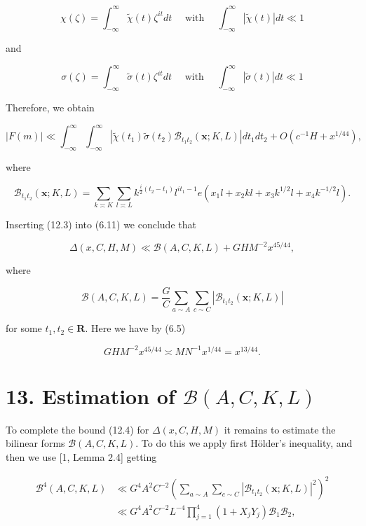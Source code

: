 \documentclass[10pt]{article}
\begin{document}
$$
\chi(\zeta)=\int_{-\infty}^{\infty} \tilde{\chi}(t) \zeta^{i t} d t \quad \text { with } \quad \int_{-\infty}^{\infty}|\tilde{\chi}(t)| d t \ll 1
$$

and

$$
\sigma(\zeta)=\int_{-\infty}^{\infty} \tilde{\sigma}(t) \zeta^{i t} d t \quad \text { with } \quad \int_{-\infty}^{\infty}|\tilde{\sigma}(t)| d t \ll 1
$$

Therefore, we obtain


\begin{equation*}
|F(m)| \ll \int_{-\infty}^{\infty} \int_{-\infty}^{\infty}\left|\tilde{\chi}\left(t_{1}\right) \tilde{\sigma}\left(t_{2}\right) \mathscr{B}_{t_{1} t_{2}}(\mathbf{x} ; K, L)\right| d t_{1} d t_{2}+O\left(c^{-1} H+x^{1 / 44}\right), \tag{12.3}
\end{equation*}


where

$$
\mathscr{B}_{t_{1} t_{2}}(\mathbf{x} ; K, L)=\sum_{k\asymp K}\sum_{l\asymp L} k^{\frac{i}{2}(t_{2}-t_{1})}l^{it_{1}-1} e\left(x_{1} l+x_{2} k l+x_{3} k^{1 / 2} l+x_{4} k^{-1 / 2} l\right) .
$$

Inserting (12.3) into (6.11) we conclude that


\begin{equation*}
\Delta(x,C,H,M)\ll\mathscr{B}(A,C,K,L)+G H M^{-2} x^{45 / 44}, \tag{12.4}
\end{equation*}


where

$$
\mathscr{B}(A, C, K, L)=\frac{G}{C} \sum_{a \sim A} \sum_{c \sim C}\left|\mathscr{B}_{t_{1}t_{2}}(\mathbf{x};K,L)\right|
$$

for some $t_{1}, t_{2} \in \mathbf{R}$. Here we have by (6.5)


\begin{equation*}
G H M^{-2} x^{45 / 44} \asymp M N^{-1} x^{1 / 44}=x^{13 / 44} . \tag{12.5}
\end{equation*}


\section*{13. Estimation of $\mathscr{B}(A, C, K, L)$}
To complete the bound (12.4) for $\Delta(x, C, H, M)$ it remains to estimate the bilinear forms $\mathscr{B}(A, C, K, L)$. To do this we apply first Hölder's inequality, and then we use [1, Lemma 2.4] getting

$$
\begin{aligned}
\mathscr{B}^{4}(A,C,K,L) & \ll G^{4} A^{2} C^{-2}\left(\sum_{a \sim A} \sum_{c \sim C}\left|\mathscr{B}_{t_{1} t_{2}}(\mathbf{x} ; K, L)\right|^{2}\right)^{2} \\
& \ll G^{4} A^{2} C^{-2} L^{-4} \prod_{j=1}^{4}\left(1+X_{j} Y_{j}\right) \mathscr{B}_{1}\mathscr{B}_{2},
\end{aligned}
$$
\end{document}
